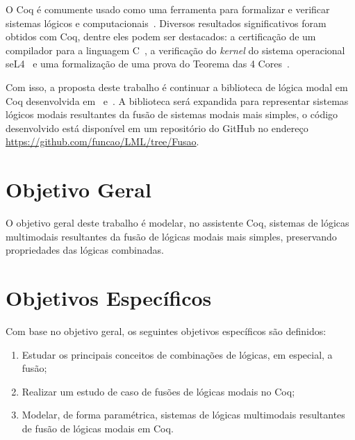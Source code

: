 	O Coq é comumente usado como uma ferramenta para formalizar e verificar sistemas lógicos e computacionais~\cite{paulinmohring2012introduction}.
	Diversos resultados significativos foram obtidos com Coq, dentre eles podem ser destacados: a certificação de um compilador para a linguagem
	C~\cite{leroy2021compcert}, a verificação do \textit{kernel} do sistema operacional seL4~\cite{klein2010sel4} e uma formalização de uma prova do
	Teorema das 4 Cores~\cite{gonthier2005computer}.

	Com isso, a proposta deste trabalho é continuar a biblioteca de lógica modal em Coq desenvolvida em~
	e~. A biblioteca será expandida para representar sistemas lógicos modais resultantes da fusão de sistemas modais mais simples, o código
	desenvolvido está disponível em um repositório do GitHub no endereço \url{https://github.com/funcao/LML/tree/Fusao}.

	\section{Objetivo Geral}
		O objetivo geral deste trabalho é modelar, no assistente Coq, sistemas de lógicas multimodais resultantes da fusão de lógicas modais mais simples,
		preservando propriedades das lógicas combinadas.

	\section{Objetivos Específicos}
		Com base no objetivo geral, os seguintes objetivos específicos são definidos:
		\begin{enumerate}
			\item Estudar os principais conceitos de combinações de lógicas, em especial, a fusão;
			\item Realizar um estudo de caso de fusões de lógicas modais no Coq;
			\item Modelar, de forma paramétrica, sistemas de lógicas multimodais resultantes de fusão de lógicas modais em Coq.
		\end{enumerate}


